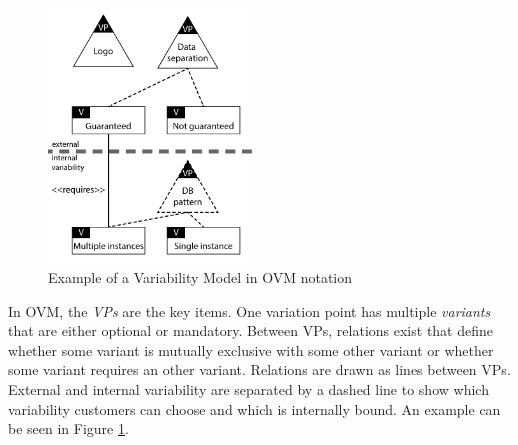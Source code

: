 \begin{itemize}
\begin{figure}[htr]
    \centering
    \includegraphics[width=0.48\textwidth]{assets/OVM}
    \caption{Example of a Variability Model in \acs{OVM} notation~\cite{mietzner2009variability}}
    \label{fig:ovm}
\end{figure}

In \ac{OVM}, the \textit{\acp{VP}} are the key items. One variation point has multiple \textit{variants} that are either optional or mandatory. Between \acp{VP}, relations exist that define whether some variant is mutually exclusive with some other variant or whether some variant requires an other variant. Relations are drawn as lines between \acp{VP}. External and internal variability are separated by a dashed line to show which variability customers can choose and which is internally bound. An example can be seen in Figure \ref{fig:ovm}.
\end{itemize}


